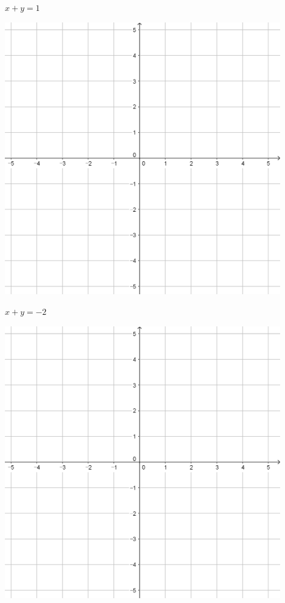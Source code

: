 \documentclass[a4paper]{oblivoir}
\begin{document}
\begin{minipage}{0.45\textwidth}\centering
\(x+y=1\)
\par\bigskip\includegraphics[width=0.9\textwidth]{55}
\end{minipage}
\begin{minipage}{0.45\textwidth}\centering
\(x+y=-2\)
\par\bigskip\includegraphics[width=0.9\textwidth]{55}
\end{minipage}\bigskip\bigskip\par
\end{document}
